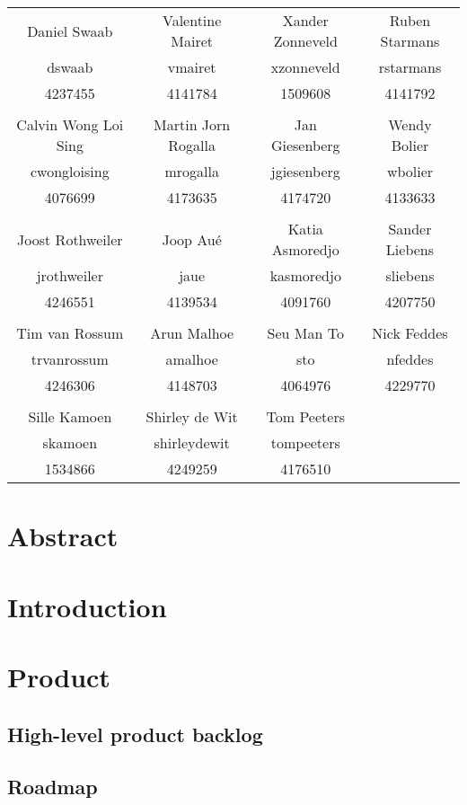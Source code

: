 \documentclass{article}
\begin{document}
\begin{tabular}{cccc}
Daniel Swaab & Valentine Mairet & Xander Zonneveld & Ruben Starmans\\
dswaab & vmairet & xzonneveld & rstarmans\\
4237455 & 4141784 & 1509608 & 4141792\\
&&&\\
Calvin Wong Loi Sing & Martin Jorn Rogalla & Jan Giesenberg & Wendy Bolier\\
cwongloising & mrogalla & jgiesenberg & wbolier\\
4076699 & 4173635 & 4174720 & 4133633\\
&&&\\
Joost Rothweiler & Joop Au\'{e} & Katia Asmoredjo & Sander Liebens\\
jrothweiler & jaue & kasmoredjo & sliebens\\
4246551 & 4139534 & 4091760 & 4207750\\
&&&\\
Tim van Rossum & Arun Malhoe & Seu Man To & Nick Feddes\\
trvanrossum & amalhoe & sto & nfeddes\\
4246306 & 4148703 & 4064976 & 4229770\\
&&&\\
Sille Kamoen & Shirley de Wit & Tom Peeters &\\
skamoen & shirleydewit & tompeeters &\\
1534866 & 4249259 & 4176510 &
\end{tabular}
\pagebreak
\section*{Abstract}

\pagebreak
\tableofcontents
\pagebreak
\section{Introduction}


\section{Product}
\subsection{High-level product backlog}
\subsection{Roadmap}

\end{document}
